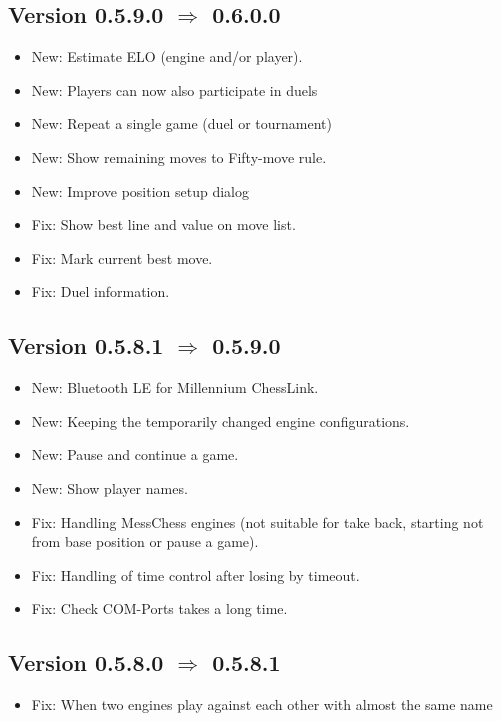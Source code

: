 \documentclass[11pt,a4paper]{article}
\begin{document}
\subsection*{Version 0.5.9.0 $\Rightarrow$  0.6.0.0}
\begin{itemize}
		\item {\color{blue}New}: Estimate ELO (engine and/or player).
		\item {\color{blue}New}: Players can now also participate in duels		
		\item {\color{blue}New}: Repeat a single game (duel or tournament)
		\item {\color{blue}New}: Show remaining moves to Fifty-move rule.		
		\item {\color{blue}New}: Improve position setup dialog		
		\item {\color{red}Fix}: Show best line and value on move list.
		\item {\color{red}Fix}: Mark current best move.
		\item {\color{red}Fix}: Duel information.		
\end{itemize}

\subsection*{Version 0.5.8.1 $\Rightarrow$  0.5.9.0}
\begin{itemize}
	\item {\color{blue}New}: Bluetooth LE for Millennium ChessLink.
	\item {\color{blue}New}: Keeping the temporarily changed engine configurations.
	\item {\color{blue}New}: Pause and continue a game.	
	\item {\color{blue}New}: Show player names.	
	\item {\color{red}Fix}: Handling MessChess engines (not suitable for take back, starting not from base position or pause a game).
	\item {\color{red}Fix}: Handling of time control after losing by timeout.
	\item {\color{red}Fix}: Check COM-Ports takes a long time.
\end{itemize}

\subsection*{Version 0.5.8.0 $\Rightarrow$  0.5.8.1}
\begin{itemize}
	\item {\color{red}Fix}: When two engines play against each other with almost the same name
\end{itemize}
\end{document}
